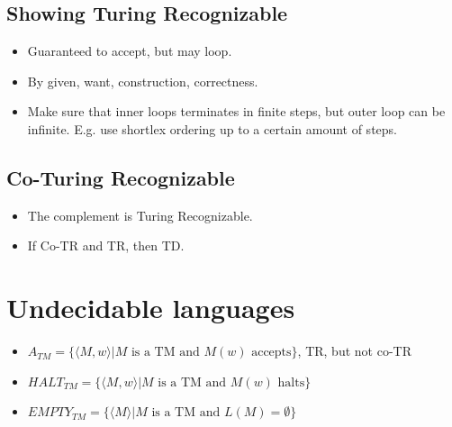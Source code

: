 \documentclass{article}
\begin{document}
\subsection{Showing Turing Recognizable}
\begin{itemize}
    \item Guaranteed to accept, but may loop.
    \item By given, want, construction, correctness.
    \item Make sure that inner loops terminates in finite steps, but outer loop can be infinite. E.g. use shortlex ordering up to a certain amount of steps.
\end{itemize}

\subsection{Co-Turing Recognizable}
\begin{itemize}
    \item The complement is Turing Recognizable.
    \item If Co-TR and TR, then TD.
\end{itemize}


\section{Undecidable languages}
\begin{itemize}
    \item $A_{TM} = \{\langle M, w\rangle | M \textrm{ is a TM and } M(w) \textrm{ accepts} \}$, TR, but not co-TR
    \item $HALT_{TM} = \{\langle M, w\rangle | M \textrm { is a TM and } M(w) \textrm{ halts}\}$
    \item $EMPTY_{TM} = \{\langle M \rangle | M \textrm{ is a TM and } L(M)=\emptyset\}$
\end{itemize}
\end{document}
